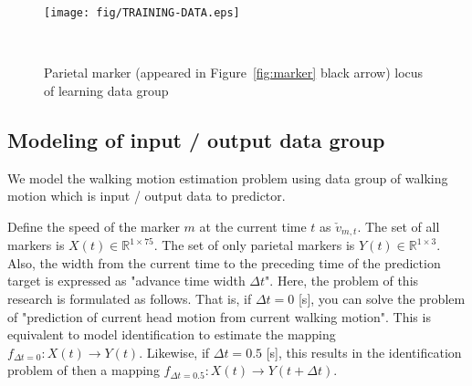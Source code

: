 \documentclass{sigchi}
\begin{document}
\begin{figure}
\centering
  \texttt{[image: fig/TRAINING-DATA.eps]}
  \caption{Parietal marker (appeared in Figure~\ref{fig:marker} black arrow) locus of learning data group}~ 
    \label{fig:training-data}
\end{figure}


\subsection{Modeling of input / output data group}
\label{projection}

We model the walking motion estimation problem using data group of walking motion which is input / output data to predictor.

Define the speed of the marker $m$ at the current time $t$ as $\check{v}_{m, t}$. The set of all markers is $X(t)\in\mathbb{R}^{1 \times 75} $. The set of only parietal markers is $ Y(t)\in\mathbb {R}^{1\times 3}$. Also, the width from the current time to the preceding time of the prediction target is expressed as "advance time width $\Delta t$". Here, the problem of this research is formulated as follows. That is, if $\Delta t = 0$ [s], you can solve the problem of "prediction of current head motion from current walking motion". This is equivalent to model identification to estimate the mapping $ f_ {\Delta t = 0}: X (t) \rightarrow Y (t) $. Likewise, if $ \Delta t = 0.5 $ [s], this results in the identification problem of then a mapping $ f_ {\Delta t = 0.5}: X (t) \rightarrow Y (t + \Delta t) $.
\end{document}
